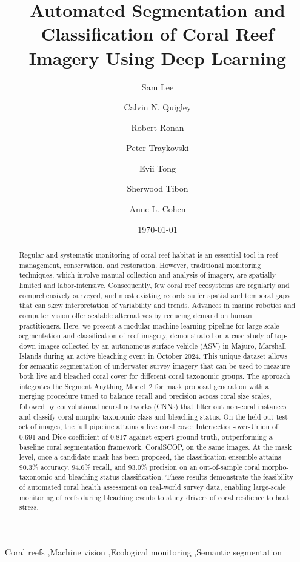 \documentclass[11pt]{elsarticle}
\date{\today}
\begin{document}
\begin{frontmatter}

\title{Automated Segmentation and Classification of Coral Reef Imagery Using Deep Learning}

\author[1,2]{Sam Lee}
\author[2]{Calvin N. Quigley}
\author[2]{Robert Ronan}
\author[2]{Peter Traykovski}
\author[2]{Evii Tong}
\author{Sherwood Tibon}
\author[2]{Anne L. Cohen}


\begin{abstract}
Regular and systematic monitoring of coral reef habitat is an essential tool in reef management, conservation, and restoration. However, traditional monitoring techniques, which involve manual collection and analysis of imagery, are spatially limited and labor-intensive. Consequently, few coral reef ecosystems are regularly and comprehensively surveyed, and most existing records suffer spatial and temporal gaps that can skew interpretation of variability and trends. Advances in marine robotics and computer vision offer scalable alternatives by reducing demand on human practitioners. Here, we present a modular machine learning pipeline for large-scale segmentation and classification of reef imagery, demonstrated on a case study of top-down images collected by an autonomous surface vehicle (ASV) in Majuro, Marshall Islands during an active bleaching event in October 2024. This unique dataset allows for semantic segmentation of underwater survey imagery that can be used to measure both live and bleached coral cover for different coral taxonomic groups. The approach integrates the Segment Anything Model~2 for mask proposal generation with a merging procedure tuned to balance recall and precision across coral size scales, followed by convolutional neural networks (CNNs) that filter out non-coral instances and classify coral morpho-taxonomic class and bleaching status. On the held-out test set of images, the full pipeline attains a live coral cover Intersection-over-Union of 0.691 and Dice coefficient of 0.817 against expert ground truth, outperforming a baseline coral segmentation framework, CoralSCOP, on the same images. At the mask level, once a candidate mask has been proposed, the classification ensemble attains 90.3\% accuracy, 94.6\% recall, and 93.0\% precision on an out-of-sample coral morpho-taxonomic and bleaching-status classification. These results demonstrate the feasibility of automated coral health assessment on real-world survey data, enabling large-scale monitoring of reefs during bleaching events to study drivers of coral resilience to heat stress.
\end{abstract}


\begin{keyword}
Coral reefs \sep Machine vision \sep Ecological monitoring \sep Semantic segmentation
\end{keyword}

\end{frontmatter}
\end{document}
